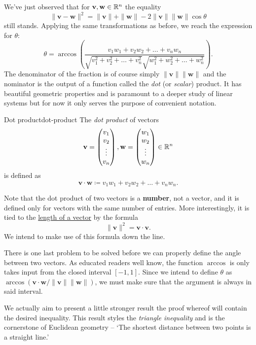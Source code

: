 We've just observed that for $\mathbf{v}, \mathbf{w} \in \mathbb{R}^{n}$ the equality
\[
 \|\mathbf{v}-\mathbf{w}\|^2 = \|\mathbf{v}\| + \|\mathbf{w}\| - 2
 \|\mathbf{v}\|\|\mathbf{w}\|\cos\theta
\]
still stands. Applying the same transformations as before, we reach the
expression for $\theta$:
\[
 \theta = \arccos \left( \frac{v_1w_1 + v_2w_2 + \ldots + v_nw_n}{\sqrt{v_1^2 +
 v_2^2 + \ldots + v_n^2}\sqrt{w_1^2 + w_2^2 + \ldots + w_n^2}} \right).
\]
The denominator of the fraction is of course simply
$\|\mathbf{v}\|\|\mathbf{w}\|$ and the nominator is the output of a function
called the \emph{dot} (or \emph{scalar}) product. It has beautiful geometric
properties and is paramount to a deeper study of linear systems but for now it
only serves the purpose of convenient notation.

\begin{definition}{Dot product}{dot-product}
 The \emph{dot product} of vectors
 \[
  \mathbf{v} =
  \begin{pmatrix}
   v_1\\
   v_2\\
   \vdots\\
   v_n
  \end{pmatrix},
  \mathbf{w} = 
  \begin{pmatrix}
   w_1\\
   w_2\\
   \vdots\\
   w_n
  \end{pmatrix} \in \mathbb{R}^{n}
 \]
 is defined as
 \[
  \mathbf{v} \cdot \mathbf{w} \coloneqq v_1w_1 + v_2w_2 + \ldots + v_nw_n.
 \]
\end{definition}

Note that the dot product of two vectors is a \textbf{number}, not a vector, and
it is defined only for vectors with the same number of entries. More
interestingly, it is tied to the \hyperref[def:length-of-a-vector]{length of a
vector} by the formula
\[
 \|\mathbf{v}\|^2 = \mathbf{v} \cdot \mathbf{v}.
\]
We intend to make use of this formula down the line.

There is one last problem to be solved before we can properly define the angle
between two vectors. As educated readers well know, the function $\arccos$ is
only takes input from the closed interval $[-1,1]$. Since we intend to define
$\theta$ as $\arccos(\mathbf{v} \cdot \mathbf{w} /
\|\mathbf{v}\|\|\mathbf{w}\|)$, we must make sure that the argument is always in
said interval.

We actually aim to present a little stronger result the proof whereof will
contain the desired inequality. This result styles the \emph{triangle
inequality} and is the cornerstone of Euclidean geometry -- `The shortest
distance between two points is a straight line.'


